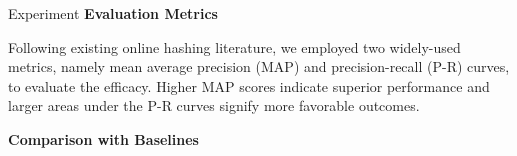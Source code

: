 \documentclass[final]{beamer}
\newlength{\colwidth}
\begin{document}
\begin{frame}[t]
\begin{columns}[t]
\begin{column}{\colwidth}
\begin{block}{Experiment}
					\textbf{Evaluation Metrics}
					
					Following existing online hashing literature, we employed two widely-used metrics, namely mean average precision (MAP) and precision-recall (P-R) curves, to evaluate the efficacy. Higher MAP scores indicate superior performance and larger areas under the P-R curves signify more favorable outcomes.
					
					\textbf{Comparison with Baselines}
					
					\begin{figure}
						\centering
						\captionsetup[subfloat]{labelformat=empty}
						\vspace{-5mm}
						\quad
						\vspace{-5mm}
\end{figure}
\end{block}
\end{column}
\end{columns}
\end{frame}
\end{document}
